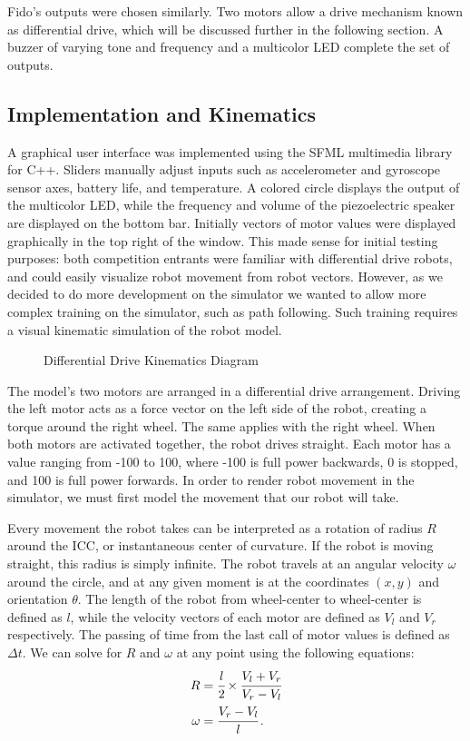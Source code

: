 Fido's outputs were chosen similarly.  Two motors allow a drive mechanism known as differential drive, which will be discussed further in the following section.  A buzzer of varying tone and frequency and a multicolor LED complete the set of outputs.  

\subsection{Implementation and Kinematics}

A graphical user interface was implemented using the SFML multimedia library for C++.  Sliders manually adjust inputs such as accelerometer and gyroscope sensor axes, battery life, and temperature.  A colored circle displays the output of the multicolor LED, while the frequency and volume of the piezoelectric speaker are displayed on the bottom bar.   Initially vectors of motor values were displayed graphically in the top right of the window.  This made sense for initial testing purposes: both competition entrants were familiar with differential drive robots, and could easily visualize robot movement from robot vectors.  However, as we decided to do more development on the simulator we wanted to allow more complex training on the simulator, such as path following.  Such training requires a visual kinematic simulation of the robot model.

\begin{figure}[ht]
	\centering
	
	\caption{Differential Drive Kinematics Diagram}
\end{figure}

The model's two motors are arranged in a differential drive arrangement.  Driving the left motor acts as a force vector on the left side of the robot, creating a torque around the right wheel.  The same applies with the right wheel.  When both motors are activated together, the robot drives straight.  Each motor has a value ranging from -100 to 100, where -100 is full power backwards, 0 is stopped, and 100 is full power forwards.   In order to render robot movement in the simulator, we must first model the movement that our robot will take.

Every movement the robot takes can be interpreted as a rotation of radius $R$ around the ICC, or instantaneous center of curvature.   If the robot is moving straight, this radius is simply infinite.   The robot travels at an angular velocity $\omega$ around the circle, and at any given moment is at the coordinates $(x,y)$ and orientation $\theta$.  The length of the robot from wheel-center to wheel-center is defined as $l$, while the velocity vectors of each motor are defined as $V_l$ and $V_r$ respectively.  The passing of time from the last call of motor values is defined as $\Delta t$.  We can solve for $R$ and $\omega$ at any point using the following equations:
\begin{align*}
	R &= \cfrac{l}{2} \times \cfrac{V_l + V_r}{V_r - V_l}\\
	\omega &= \cfrac{V_r - V_l}{l}\,.
\end{align*}

